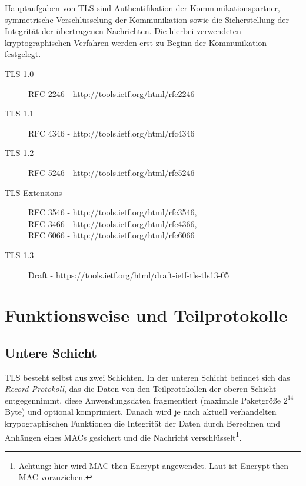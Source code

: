 \documentclass[
    12pt,
    headings=small,
    parskip=half,           %
    bibliography=totoc,
    numbers=noenddot,       %
    open=any,               %
    ]{scrreprt}
\begin{document}
Hauptaufgaben von TLS sind Authentifikation der Kommunikationspartner, symmetrische Verschlüsselung der Kommunikation sowie die Sicherstellung der Integrität der übertragenen Nachrichten. Die hierbei verwendeten kryptographischen Verfahren werden erst zu Beginn der Kommunikation festgelegt. 
\cite{eckert13}

\begin{description}
	\item[TLS 1.0] RFC 2246 - http://tools.ietf.org/html/rfc2246
	\item[TLS 1.1] RFC 4346 - http://tools.ietf.org/html/rfc4346
	\item[TLS 1.2] RFC 5246 - http://tools.ietf.org/html/rfc5246
	\item[TLS Extensions] RFC 3546 - http://tools.ietf.org/html/rfc3546, \\
RFC 3466 - http://tools.ietf.org/html/rfc4366, \\
RFC 6066 - http://tools.ietf.org/html/rfc6066
	\item[TLS 1.3] Draft - https://tools.ietf.org/html/draft-ietf-tls-tls13-05
\end{description}

\chapter{Funktionsweise und Teilprotokolle}


\section{Untere Schicht}

TLS besteht selbst aus zwei Schichten. In der unteren Schicht befindet sich das \emph{Record-Protokoll}, das die Daten von den Teilprotokollen der oberen Schicht entgegennimmt, diese Anwendungsdaten fragmentiert (maximale Paketgröße \(2^{14}\) Byte) und optional komprimiert. Danach wird je nach aktuell verhandelten krypographischen Funktionen die Integrität der Daten durch Berechnen und Anhängen eines MACs gesichert und die Nachricht verschlüsselt\footnote{Achtung: hier wird MAC-then-Encrypt angewendet. Laut \cite{AE2000} ist Encrypt-then-MAC vorzuziehen.}.  
\end{document}
